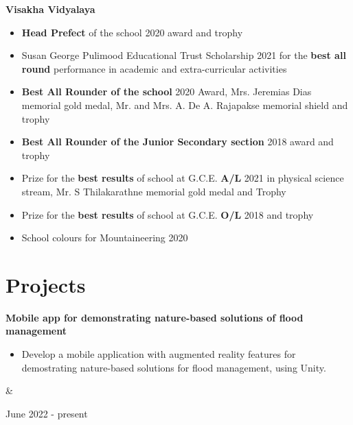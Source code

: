 \documentclass[10pt, a4paper]{article}
\newenvironment{highlights}{
        \begin{itemize}[
                topsep=0pt,
                parsep=0.10 cm,
                partopsep=0pt,
                itemsep=0pt,
                after=\vspace{-1\baselineskip},
                leftmargin=0.4 cm + 3pt
            ]
    }{
        \end{itemize}
    } %
\let\originalTabularx\tabularx
\let\originalEndTabularx\endtabularx
\renewenvironment{tabularx}{\bgroup\centering\originalTabularx}{\originalEndTabularx\par\egroup}
\begin{document}
        \textbf{Visakha Vidyalaya}  \begin{highlights}
        \item \textbf{Head Prefect} of the school 2020 award and trophy
        \item Susan George Pulimood Educational Trust Scholarship 2021 for the \textbf{best all round} performance in academic and extra-curricular activities
	   \item \textbf{Best All Rounder of the school} 2020 Award, Mrs. Jeremias Dias memorial gold medal, Mr. and Mrs. A. De A. Rajapakse memorial shield and trophy
	   \item \textbf{Best All Rounder of the Junior Secondary section} 2018 award and trophy
		\item Prize for the \textbf{best results} of school at G.C.E. \textbf{A/L} 2021 in physical science stream, Mr. S Thilakarathne memorial gold medal and Trophy
		\item Prize for the \textbf{best results} of school at G.C.E. \textbf{O/L} 2018 and trophy
		\item School colours for Mountaineering 2020
	\end{highlights}
        \par\endgroup
    
    \vspace{0.4 cm}
    
    \section{Projects}

        \begin{tabularx}{
            \textwidth-0.4 cm-0.13cm
        }{
            K{0.2 cm}
            R{4.1 cm}
        }
            \textbf{Mobile app for demonstrating nature-based solutions of flood management}

            \vspace{0.10 cm}

            \begin{highlights}
                \item Develop a mobile application with augmented reality features for demostrating nature-based solutions for flood management, using Unity.
            \end{highlights}
            &
            

            June 2022 - present
        \end{tabularx}
\end{document}
